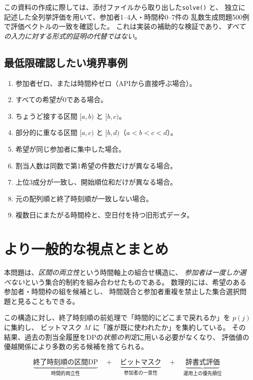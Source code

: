 \documentclass[11pt,a4paper]{ltjsarticle}
\theoremstyle{definition}
\theoremstyle{remark}
\newcommand{\code}[1]{\texttt{#1}}
\begin{document}
この資料の作成に際しては、添付ファイルから取り出した\code{solve()} と、
独立に記述した全列挙評価を用いて、参加者1--4人・時間枠0--7件の
乱数生成問題500例で評価ベクトルの一致を確認した。
これは実装の補助的な検証であり、\emph{すべての入力に対する形式的証明の代替ではない}。

\subsection{最低限確認したい境界事例}
\begin{enumerate}
\item 参加者ゼロ、または時間枠ゼロ（APIから直接呼ぶ場合）。
\item すべての希望が0である場合。
\item ちょうど接する区間 $[a,b)$ と $[b,c)$。
\item 部分的に重なる区間 $[a,c)$ と $[b,d)$（$a<b<c<d$）。
\item 希望が同じ参加者に集中した場合。
\item 割当人数は同数で第1希望の件数だけが異なる場合。
\item 上位3成分が一致し、開始順位和だけが異なる場合。
\item 元の配列順と終了時刻順が一致しない場合。
\item 複数日にまたがる時間枠と、空日付を持つ旧形式データ。
\end{enumerate}

\section{より一般的な視点とまとめ}
本問題は、\emph{区間の両立性}という時間軸上の組合せ構造に、
\emph{参加者は一度しか選べない}という集合的制約を組み合わせたものである。
数理的には、希望のある参加者・時間枠の組を候補とし、
時間競合と参加者重複を禁止した集合選択問題と見ることもできる。

この構造に対し、終了時刻順の前処理で「時間的にどこまで戻れるか」を $p(j)$ に集約し、
ビットマスク $M$ に「誰が既に使われたか」を集約している。
その結果、過去の割当全履歴をDPの\emph{状態の判定}に用いる必要がなくなり、
評価値の優越関係により多数の劣る候補を捨てられる。

\begin{equation*}
 \boxed{
 \underbrace{\text{終了時刻順の区間DP}}_{\text{時間的両立性}}
 \quad+\quad
 \underbrace{\text{ビットマスク}}_{\text{参加者の一意性}}
 \quad+\quad
 \underbrace{\text{辞書式評価}}_{\text{運用上の優先順位}}
 }
\end{equation*}
\end{document}
